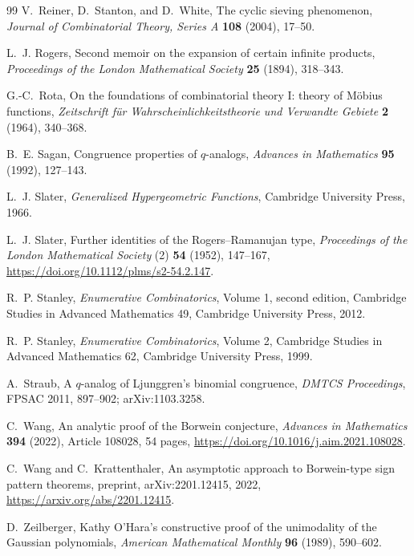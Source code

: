 \documentclass[11pt,a4paper,oneside,openany]{book}
\theoremstyle{definition}
\theoremstyle{remark}
\begin{document}
\begin{thebibliography}{99}
V.~Reiner, D.~Stanton, and D.~White,
The cyclic sieving phenomenon,
\emph{Journal of Combinatorial Theory, Series A} \textbf{108} (2004), 17--50.

L.~J. Rogers,
Second memoir on the expansion of certain infinite products,
\emph{Proceedings of the London Mathematical Society} \textbf{25} (1894), 318--343.

G.-C.~Rota,
On the foundations of combinatorial theory I: theory of M\"obius functions,
\emph{Zeitschrift f\"ur Wahrscheinlichkeitstheorie und Verwandte Gebiete} \textbf{2} (1964), 340--368.

B.~E. Sagan,
Congruence properties of $q$-analogs,
\emph{Advances in Mathematics} \textbf{95} (1992), 127--143.

L.~J. Slater,
\emph{Generalized Hypergeometric Functions},
Cambridge University Press, 1966.

L.~J. Slater,
Further identities of the Rogers--Ramanujan type,
\emph{Proceedings of the London Mathematical Society} (2)
\textbf{54} (1952), 147--167,
\url{https://doi.org/10.1112/plms/s2-54.2.147}.

R.~P. Stanley,
\emph{Enumerative Combinatorics}, Volume 1, second edition,
Cambridge Studies in Advanced Mathematics 49, Cambridge University Press, 2012.

R.~P. Stanley,
\emph{Enumerative Combinatorics}, Volume 2,
Cambridge Studies in Advanced Mathematics 62, Cambridge University Press, 1999.

A.~Straub,
A $q$-analog of Ljunggren's binomial congruence,
\emph{DMTCS Proceedings}, FPSAC 2011, 897--902; arXiv:1103.3258.

C.~Wang,
An analytic proof of the Borwein conjecture,
\emph{Advances in Mathematics} \textbf{394} (2022), Article 108028,
54 pages,
\url{https://doi.org/10.1016/j.aim.2021.108028}.

C.~Wang and C.~Krattenthaler,
An asymptotic approach to Borwein-type sign pattern theorems,
preprint, arXiv:2201.12415, 2022,
\url{https://arxiv.org/abs/2201.12415}.

D.~Zeilberger,
Kathy O'Hara's constructive proof of the unimodality of the Gaussian polynomials,
\emph{American Mathematical Monthly} \textbf{96} (1989), 590--602.


\end{thebibliography}
\end{document}

